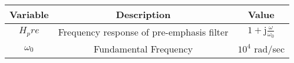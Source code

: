 \begin{tabular}{|c|c|c|} 
      \hline
\textbf{Variable}& \textbf{Description}& \textbf{Value}\\\hline
        $H_pre$& Frequency response of pre-emphasis filter & $1+\text{j}\frac{\omega}{\omega_0}$\\ \hline
        $\omega_0$ &Fundamental Frequency & $10^4$ rad/sec \\ \hline
    \end{tabular}